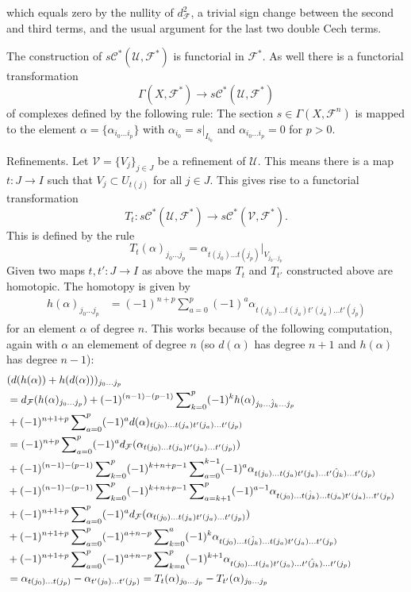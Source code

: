 which equals zero by the nullity of $d_{\mathcal F}^2$, 
a trivial sign change between the second and third terms, and
the usual argument for the last two double Cech terms.

\medskip\noindent
The construction of $s{\mathcal C}^*({\mathcal U}, {\mathcal F}^*)$
is functorial in ${\mathcal F}^*$. As well there is a functorial
transformation
$$
\Gamma(X, {\mathcal F}^*)
\longrightarrow
s{\mathcal C}^*({\mathcal U}, {\mathcal F}^*)
$$
of complexes defined by the following rule: The section
$s\in \Gamma(X,{\mathcal F}^n)$
is mapped to the element $\alpha=\{\alpha_{i_0\ldots i_p}\}$
with $\alpha_{i_0} = s|_{I_{i_0}}$ and $\alpha_{i_0\ldots i_p}=0$
for $p>0$.

\medskip\noindent
Refinements. Let ${\mathcal V} = \{ V_j \}_{j\in J}$ be a
refinement of ${\mathcal U}$. This means there is a map $t: J \to I$
such that $V_j \subset U_{t(j)}$ for all $j\in J$. This gives
rise to a functorial transformation
$$
T_t : s{\mathcal C}^*({\mathcal U}, {\mathcal F}^*)
\longrightarrow
s{\mathcal C}^*({\mathcal V}, {\mathcal F}^*).
$$
This is defined by the rule
$$
T_t(\alpha)_{j_0\ldots j_p}
= 
\alpha_{t(j_0)\ldots t(j_p)}|_{V_{j_0\ldots j_p}}
$$
Given two maps $t,t' : J \to I$ as above the maps
$T_t$ and $T_{t'}$ constructed above are homotopic.
The homotopy is given by
\begin{align*}
h(\alpha)_{j_0\ldots j_p}
& =
(-1)^{n+p}
\sum\nolimits_{a=0}^{p}
(-1)^a
\alpha_{t(j_0)\ldots t(j_a) t'(j_a) \ldots t'(j_p)}
\end{align*}
for an element $\alpha$ of degree $n$. This works
because of the following computation, again with
$\alpha$ an elemement of degree $n$ (so $d(\alpha)$
has degree $n+1$ and $h(\alpha)$ has degree $n-1$):
\begin{align*}
& (
d(h(\alpha)) + h(d(\alpha))
)_{j_0\ldots j_p}
\cr
& = 
d_{\mathcal F}(h(\alpha)_{j_0\ldots j_p})
+
(-1)^{(n-1)-(p-1)}
\sum\nolimits_{k=0}^p
(-1)^k
h(\alpha)_{j_0\ldots\hat j_k\ldots j_p}
\cr
& +
(-1)^{n+1+p}
\sum\nolimits_{a=0}^p
(-1)^a
d(\alpha)_{t(j_0)\ldots t(j_a) t'(j_a) \ldots t'(j_p)}
\cr
& =
(-1)^{n+p}
\sum\nolimits_{a=0}^p
(-1)^a
d_{\mathcal F}(\alpha_{t(j_0)\ldots t(j_a) t'(j_a) \ldots t'(j_p)})
\cr
& +
(-1)^{(n-1)-(p-1)}
\sum\nolimits_{k=0}^p
(-1)^{k+n+p-1}
\sum\nolimits_{a=0}^{k-1}
(-1)^a
\alpha_{t(j_0)\ldots t(j_a)t'(j_a)\ldots\hat{t'(j_k)}\ldots t'(j_p)}
\cr
& +
(-1)^{(n-1)-(p-1)}
\sum\nolimits_{k=0}^p
(-1)^{k+n+p-1}
\sum\nolimits_{a=k+1}^p
(-1)^{a-1}
\alpha_{t(j_0)\ldots\hat{t(j_k)}\ldots t(j_a)t'(j_a)\ldots t'(j_p)}
\cr
& +
(-1)^{n+1+p}
\sum\nolimits_{a=0}^p
(-1)^a
d_{\mathcal F}(\alpha_{t(j_0)\ldots t(j_a) t'(j_a) \ldots t'(j_p)})
\cr
& +
(-1)^{n+1+p}
\sum\nolimits_{a=0}^p
(-1)^{a+n-p}
\sum\nolimits_{k=0}^a
(-1)^k
\alpha_{t(j_0)\ldots \hat{t(j_k)}\ldots t(j_a)t'(j_a)\ldots t'(j_p)}
\cr
& +
(-1)^{n+1+p}
\sum\nolimits_{a=0}^p
(-1)^{a+n-p}
\sum\nolimits_{k=a}^p
(-1)^{k+1}
\alpha_{t(j_0)\ldots t(j_a)t'(j_a)\ldots \hat{t'(j_k)}\ldots t'(j_p)}
\cr
& = 
\alpha_{t(j_0)\ldots t(j_p)} - \alpha_{t'(j_0)\ldots t'(j_p)}
=
T_t(\alpha)_{j_0\ldots j_p} - T_{t'}(\alpha)_{j_0\ldots j_p}
\end{align*}
